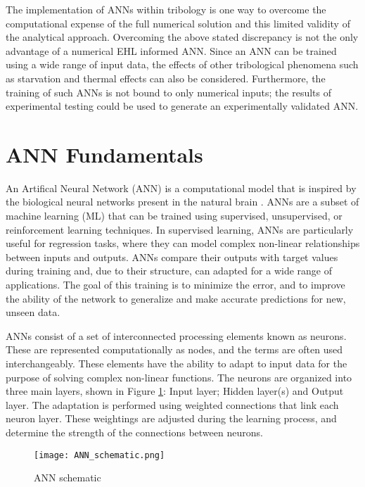 The implementation of ANNs within tribology is one way to overcome the computational expense of the full numerical solution and this limited validity of the analytical approach. Overcoming the above stated discrepancy is not the only advantage of a numerical EHL informed ANN. Since an ANN can be trained using a wide range of input data, the effects of other tribological phenomena such as starvation and thermal effects can also be considered. Furthermore, the training of such ANNs is not bound to only numerical inputs; the results of experimental testing could be used to generate an experimentally validated ANN.

\section{ANN Fundamentals}

An Artifical Neural Network (ANN) is a computational model that is inspired by the biological neural networks present in the natural brain \cite{Sarkar2017}. ANNs are a subset of machine learning (ML) that can be trained using supervised, unsupervised, or reinforcement learning techniques. In supervised learning, ANNs are particularly useful for regression tasks, where they can model complex non-linear relationships between inputs and outputs. ANNs compare their outputs with target values during training and, due to their structure, can adapted for a wide range of applications. The goal of this training is to minimize the error, and to improve the ability of the network to generalize and make accurate predictions for new, unseen data.

ANNs consist of a set of interconnected processing elements known as neurons. These are represented computationally as nodes, and the terms are often used interchangeably. These elements have the ability to adapt to input data for the purpose of solving complex non-linear functions. The neurons are organized into three main layers, shown in Figure \ref{ANN schematic}: Input layer; Hidden layer(s) and Output layer. The adaptation is performed using weighted connections that link each neuron layer. These weightings are adjusted during the learning process, and determine the strength of the connections between neurons.

\begin{figure}
	\centering  
	\texttt{[image: ANN\_schematic.png]}
	\caption{ANN schematic}
	\label{ANN schematic}
\end{figure} 

